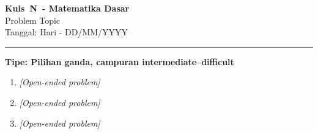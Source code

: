\documentclass[12pt,a4paper]{article}
\newif\ifkuis
\newcommand{\nomor}{N}
\newcommand{\mapel}{Matematika Dasar}
\newcommand{\topik}{Problem Topic}
\newcommand{\tanggal}{Hari - DD/MM/YYYY}
\newcommand{\setlevel}{easy / intermediate / difficult}
\newcommand{\jenis}{Kuis}
\newcommand{\metalevel}{Tipe: Pilihan ganda, campuran intermediate--difficult}
\newcommand{\jenis}{Set}
\newcommand{\metalevel}{Tingkat: \setlevel}
\newenvironment{soal}
	{\begin{enumerate}[label=\arabic*., leftmargin=*, itemsep=1.1em, topsep=0.5em]}
	{\end{enumerate}}
\newenvironment{pilihan}
	{\begin{enumerate}[label=\Alph*., leftmargin=2.5em, itemsep=0.2em, topsep=0.3em]}
	{\end{enumerate}}
\newcommand{\sheetheader}{
	\begin{center}
		{\Large\textbf{\jenis\ \nomor\ - \mapel}}\\[4pt]
		{\large \topik}\\[4pt]
		Tanggal: \tanggal
	\end{center}
	\vspace{0.4em}
	\hrule
	\vspace{0.8em}
	\textbf{\metalevel}
	\vspace{0.6em}
}
\begin{document}
\sheetheader

\ifkuis

\begin{soal}
	\item \textit{[Problem]}
	\begin{pilihan}
		\item \textit{[Option A]}
		\item \textit{[Option B]}
		\item \textit{[Option C]}
		\item \textit{[Option D]}
		\item \textit{[Option E]}
	\end{pilihan}

	\item \textit{[Problem]}
	\begin{pilihan}
		\item \textit{[Option A]}
		\item \textit{[Option B]}
		\item \textit{[Option C]}
		\item \textit{[Option D]}
		\item \textit{[Option E]}
	\end{pilihan}
\end{soal}

\else

\begin{soal}
	\item \textit{[Open-ended problem]}

	\item \textit{[Open-ended problem]}

	\item \textit{[Open-ended problem]}
\end{soal}

\fi
\end{document}
